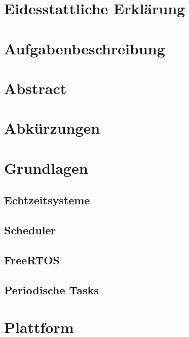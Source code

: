 \documentclass{scrartcl}
\begin{document}
	\begin{titlepage}
		
	\end{titlepage}
	\clearpage 
	\section*{Eidesstattliche Erklärung}
		
		\clearpage
	\section*{Aufgabenbeschreibung}
		
		\clearpage
	\section*{Abstract}
		
		\clearpage
	\tableofcontents
		\clearpage
	\section*{Abkürzungen}
		
		\clearpage
	\clearpage
	\section{Grundlagen}
		
		\subsection{Echtzeitsysteme}
			
		\subsection{Scheduler}
			
		\subsection{FreeRTOS}
			
		\subsection{Periodische Tasks}
			
		\clearpage
	\section{Plattform}
		
		\clearpage
	\listoffigures
		\clearpage
	\listoftables
		\printbibliography{}
		\clearpage
\end{document}
